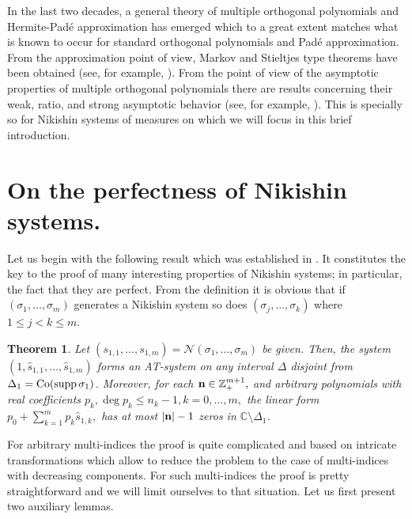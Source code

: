 \documentclass{amsart}
\newtheorem{teo}{\sc Theorem}[section]
\theoremstyle{definition}
\theoremstyle{remark}
\newcommand{\supp}{\operatorname{supp }}
\begin{document}
In the last two decades, a general theory of multiple orthogonal polynomials and Hermite-Pad\'e approximation has emerged which to a great extent matches what is known to occur for standard orthogonal polynomials and Pad\'e approximation. From the approximation point of view, Markov and Stieltjes type theorems have been obtained (see, for example, \cite{Bus, DrSt1, DrSt2, LF2, LF3, GR, GRS, LS, LS2,Nik}). From the point of view of the asymptotic properties of multiple orthogonal polynomials there are results concerning their weak, ratio, and strong asymptotic behavior (see, for example, \cite{Apt1, Apt2, AptLopRoc,FLLS,LL,LS}). This is specially so for Nikishin systems of measures on which we will focus in this brief introduction.

\section{On the perfectness of  Nikishin systems.}

Let us begin with the following result which was established in \cite{FidLop}. It constitutes the key to the proof of many interesting properties of Nikishin systems; in particular, the fact that they are perfect. From the definition it is obvious that if $(\sigma_1,\ldots,\sigma_m)$ generates a Nikishin system so does $(\sigma_j,\ldots,\sigma_k)$ where $1\leq j < k \leq m$.

\begin{teo}
\label{teo:1}
Let $(s_{1,1},\ldots,s_{1,m}) = {\mathcal{N}}(\sigma_{1},\ldots,\sigma_m)$ be given. Then, the system  $(1,\widehat{s}_{1,1},\ldots,\widehat{s}_{1,m})$ forms an AT-system on any interval $\Delta$ disjoint from $\Delta_1 = \mbox{\rm Co}(\supp \sigma_1)$. Moreover, for each ${\bf n} \in {\mathbb{Z}}_+^{m+1},$ and arbitrary polynomials with real coefficients $p_k, \deg p_k \leq n_k-1, k=0,\ldots,m,$ the linear form $p_0 + \sum_{k=1}^m p_k \widehat{s}_{1,k}, $ has at most $|{\bf n}|-1$ zeros in ${\mathbb{C}} \setminus \Delta_1$.
\end{teo}

For arbitrary multi-indices the proof is quite complicated and based on intricate transformations which allow to reduce the problem to the case of multi-indices with decreasing components. For such multi-indices the proof is pretty straightforward and we will limit ourselves to that situation.  Let us first present two auxiliary lemmas.
\end{document}
